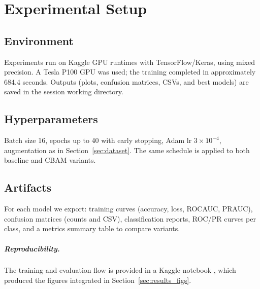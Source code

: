 \chapter{Experimental Setup}
\section{Environment}
Experiments run on Kaggle GPU runtimes with TensorFlow/Keras, using mixed precision. A Tesla P100 GPU was used; the training completed in approximately 684.4 seconds. Outputs (plots, confusion matrices, CSVs, and best models) are saved in the session working directory.

\section{Hyperparameters}
Batch size 16, epochs up to 40 with early stopping, Adam lr $3\times10^{-4}$, augmentation as in Section~\ref{sec:dataset}. The same schedule is applied to both baseline and CBAM variants.

\section{Artifacts}
For each model we export: training curves (accuracy, loss, ROC\textendash AUC, PR\textendash AUC), confusion matrices (counts and CSV), classification reports, ROC/PR curves per class, and a metrics summary table to compare variants.

\paragraph{Reproducibility.} The training and evaluation flow is provided in a Kaggle notebook \cite{takrimNotebook}, which produced the figures integrated in Section~\ref{sec:results_figs}.

